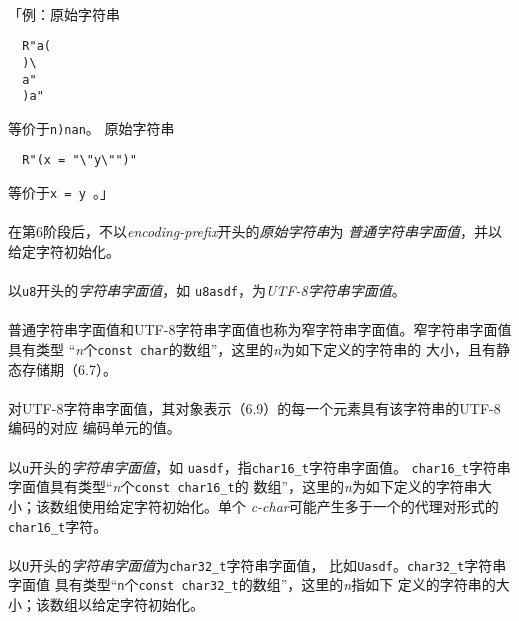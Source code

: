 \paragraph{}
「例：原始字符串
\begin{lstlisting}
  R"a(
  )\
  a"
  )a"
\end{lstlisting}
等价于\texttt{\qdbl\bslh n)\bslh\bslh\bslh na\bslh\qdbl\bslh n\qdbl}。
原始字符串
\begin{lstlisting}
  R"(x = "\"y\"")"
\end{lstlisting}
等价于\texttt{\qdbl x = \bslh\qdbl\bslh\bslh\bslh\qdbl y\bslh\bslh\bslh\qdbl
\bslh\qdbl\qdbl}。」

\paragraph{}
在第6阶段后，不以\textit{encoding-prefix}开头的\textit{原始字符串}为
\textit{普通字符串字面值}，并以给定字符初始化。

\paragraph{}
以\texttt{u8}开头的\textit{字符串字面值}，如
\texttt{u8\qdbl{}asdf\qdbl}，为\textit{UTF-8字符串字面值}。

\paragraph{}
普通字符串字面值和UTF-8字符串字面值也称为窄字符串字面值。窄字符串字面值具有类型
``\textit{n}个\texttt{const char}的数组''，这里的\textit{n}为如下定义的字符串的
大小，且有静态存储期（6.7）。

\paragraph{}
对UTF-8字符串字面值，其对象表示（6.9）的每一个元素具有该字符串的UTF-8编码的对应
编码单元的值。

\paragraph{}
以\texttt{u}开头的\textit{字符串字面值}，如
\texttt{u\qdbl{}asdf\qdbl}，指\texttt{char16\_t}字符串字面值。
\texttt{char16\_t}字符串字面值具有类型``\textit{n}个\texttt{const char16\_t}的
数组''，这里的\textit{n}为如下定义的字符串大小；该数组使用给定字符初始化。单个
\textit{c-char}可能产生多于一个的代理对形式的\texttt{char16\_t}字符。

\paragraph{}
以\texttt{U}开头的\textit{字符串字面值}为\texttt{char32\_t}字符串字面值，
比如\texttt{U\qdbl{}asdf\qdbl}。\texttt{char32\_t}字符串字面值
具有类型``\texttt{n}个\texttt{const char32\_t}的数组''，这里的\textit{n}指如下
定义的字符串的大小；该数组以给定字符初始化。

